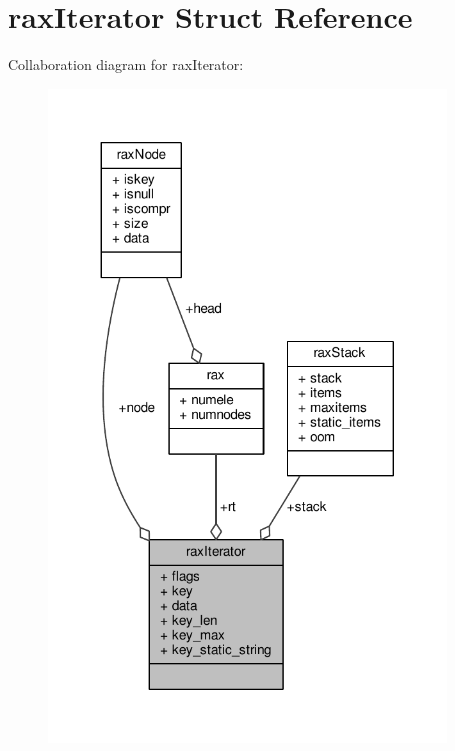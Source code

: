 \hypertarget{structraxIterator}{}\section{rax\+Iterator Struct Reference}
\label{structraxIterator}


Collaboration diagram for rax\+Iterator\+:\nopagebreak
\begin{figure}[H]
\begin{center}
\leavevmode
\includegraphics[width=299pt]{structraxIterator__coll__graph}
\end{center}
\end{figure}
